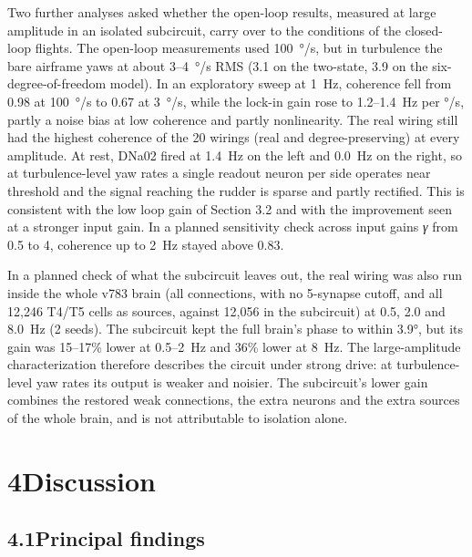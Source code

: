 \documentclass[11pt,letterpaper]{article}
\begin{document}
\noindent Two further analyses asked whether the open-loop results,
measured at large amplitude in an isolated subcircuit, carry over to the
conditions of the closed-loop flights. The open-loop measurements used
100~°/s, but in turbulence the bare airframe yaws at about 3--4~°/s RMS
(3.1 on the two-state, 3.9 on the six-degree-of-freedom model). In an
exploratory sweep at 1~Hz, coherence fell from 0.98 at 100~°/s to 0.67
at 3~°/s, while the lock-in gain rose to 1.2--1.4~Hz per °/s, partly a
noise bias at low coherence and partly nonlinearity. The real wiring
still had the highest coherence of the 20 wirings (real and
degree-preserving) at every amplitude. At rest, DNa02 fired at 1.4~Hz on
the left and 0.0~Hz on the right, so at turbulence-level yaw rates a
single readout neuron per side operates near threshold and the signal
reaching the rudder is sparse and partly rectified. This is consistent
with the low loop gain of Section 3.2 and with the improvement seen at a
stronger input gain. In a planned sensitivity check across input gains
\emph{γ} from 0.5 to 4, coherence up to 2~Hz stayed above 0.83.

In a planned check of what the subcircuit leaves out, the real wiring
was also run inside the whole v783 brain (all connections, with no
5-synapse cutoff, and all 12,246 T4/T5 cells as sources, against 12,056
in the subcircuit) at 0.5, 2.0 and 8.0~Hz (2 seeds). The subcircuit kept
the full brain's phase to within 3.9°, but its gain was 15--17\% lower
at 0.5--2~Hz and 36\% lower at 8~Hz. The large-amplitude
characterization therefore describes the circuit under strong drive: at
turbulence-level yaw rates its output is weaker and noisier. The
subcircuit's lower gain combines the restored weak connections, the
extra neurons and the extra sources of the whole brain, and is not
attributable to isolation alone.

\protect{}\label{s4}
\section{\texorpdfstring{4\quad Discussion}{4Discussion}}\label{discussion}

\subsection{\texorpdfstring{4.1\quad Principal
findings}{4.1Principal findings}}\label{principal-findings}
\end{document}

